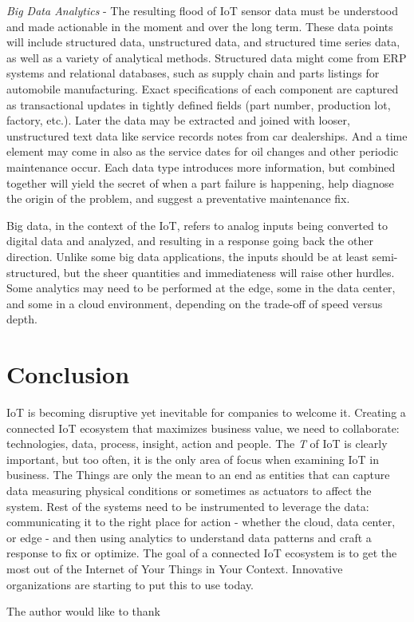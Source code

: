 \documentclass[sigconf]{acmart}
\begin{document}
{\em Big Data Analytics} - The resulting flood of IoT sensor data must be understood and made actionable in the moment and over the long term. These data points will include structured data, unstructured data, and structured time series data, as well as a variety of analytical methods. Structured data might come from ERP systems and relational databases, such as supply chain and parts listings for automobile manufacturing. Exact specifications of each component are captured as transactional updates in tightly defined fields (part number, production lot, factory, etc.). Later the data may be extracted and joined with looser, unstructured text data like service records notes from car dealerships. And a time element may come in also as the service dates for oil changes and other periodic maintenance occur. Each data type introduces more information, but combined together will yield the secret of when a part failure is happening, help diagnose the origin of the problem, and suggest a preventative maintenance fix. 

Big data, in the context of the IoT, refers to analog inputs being converted to digital data and analyzed, and resulting in a response going back the other direction. Unlike some big data applications, the inputs should be at least semi-structured, but the sheer quantities and immediateness will raise other hurdles. Some analytics may need to be performed at the edge, some in the data center, and some in a cloud environment, depending on the trade-off of speed versus depth.

\section{Conclusion}

IoT is becoming disruptive yet inevitable for companies to welcome it. Creating a connected IoT ecosystem that maximizes business value, we need to collaborate: technologies, data, process, insight, action and people. The {\em T} of IoT is clearly important, but too often, it is the only area of focus when examining IoT in business. The Things are only the mean to an end as entities that can capture data measuring physical conditions or sometimes as actuators to affect the system. Rest of the systems need to be instrumented to leverage the data: communicating it to the right place for action - whether the cloud, data center, or edge - and then using analytics to understand data patterns and craft a response to fix or optimize. The goal of a connected IoT ecosystem is to get the most out of the Internet of Your Things in Your Context. Innovative organizations are starting to put this to use today.

\begin{acks}

  The author would like to thank 

\end{acks}


 
\end{document}
